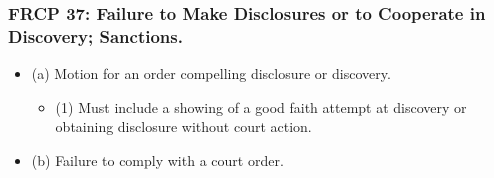 \subsubsection{FRCP 37: Failure to Make Disclosures or to Cooperate in Discovery; Sanctions.}

\begin{itemize}
    \item (a) Motion for an order compelling disclosure or discovery.
    \begin{itemize}
        \item (1) Must include a showing of a good faith attempt at discovery or obtaining disclosure without court action.
    \end{itemize}
    \item (b) Failure to comply with a court order.
\end{itemize}
